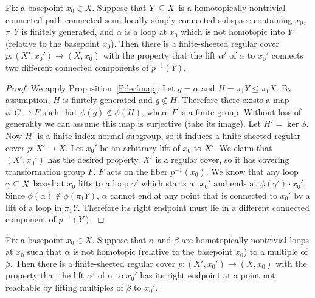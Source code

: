 \begin{prop}\label{P:lerf1}

Fix a basepoint $x_0 \in X$.  Suppose that $Y \subseteq X$ is a homotopically
nontrivial connected path-connected semi-locally simply connected subspace
containing $x_0$, $\pi_1Y$ is finitely generated, and $\alpha$ is a loop at
$x_0$ which is not homotopic into $Y$ (relative to the basepoint $x_0$). Then
there is a finite-sheeted regular cover $p \colon (X',x_0') \to (X,x_0)$ with
the property that the lift $\alpha'$ of $\alpha$ to $x_0'$ connects two
different connected components of $p^{-1}(Y)$.

\end{prop}

\begin{proof}

We apply Proposition~\ref{P:lerfmap}. Let $g = \alpha$ and $H = \pi_1Y \leq
\pi_1X$.  By assumption, $H$ is finitely generated and $g \notin H$. Therefore
there exists a map $\phi \colon G \to F$ such that $\phi(g) \notin \phi(H)$,
where $F$ is a finite group.  Without loss of generality we can assume this map
is surjective (take its image). Let $H' = \operatorname{ker} \phi$. Now $H'$ is
a finite-index normal subgroup, so it induces a finite-sheeted regular cover $p
\colon X' \to X$.  Let $x_0'$ be an arbitrary lift of $x_0$ to $X'$. We claim
that $(X',x_0')$ has the desired property.  $X'$ is a regular cover, so it has
covering transformation group $F$.  $F$ acts on the fiber $p^{-1}(x_0)$. We
know that any loop $\gamma \subseteq X$ based at $x_0$ lifts to a loop $\gamma'$
which starts at $x_0'$ and ends at $\phi(\gamma') \cdot x_0'$.  Since
$\phi(\alpha) \notin \phi(\pi_1Y)$, $\alpha$ cannot end at any point that is
connected to $x_0'$ by a lift of a loop in $\pi_1Y$.  Therefore its right
endpoint must lie in a different connected component of $p^{-1}(Y)$.

\end{proof}

\begin{prop}\label{P:lerf2}

Fix a basepoint $x_0 \in X$.  Suppose that $\alpha$ and $\beta$ are
homotopically nontrivial loops at $x_0$ such that $\alpha$ is not homotopic
(relative to the basepoint $x_0$) to a multiple of $\beta$.  Then there is
a finite-sheeted regular cover $p \colon (X',x_0') \to (X,x_0)$ with the
property that the lift $\alpha'$ of $\alpha$ to $x_0'$ has its right endpoint
at a point not reachable by lifting multiples of $\beta$ to $x_0'$.

\end{prop}

